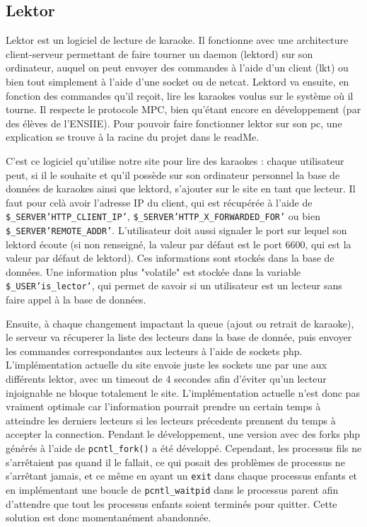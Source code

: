 \subsection{Lektor}

Lektor est un logiciel de lecture de karaoke. Il fonctionne avec une architecture client-serveur permettant de faire tourner un daemon (lektord) sur son ordinateur, auquel on peut envoyer des commandes à l'aide d'un client (lkt) ou bien tout simplement à l'aide d'une socket ou de netcat. Lektord va ensuite, en fonction des commandes qu'il reçoit, lire les karaokes voulus sur le système où il tourne. Il respecte le protocole MPC, bien qu'étant encore en développement (par des élèves de
l'ENSIIE).\newline
Pour pouvoir faire fonctionner lektor sur son pc, une explication se trouve à la racine du projet dans le readMe.\newline

C'est ce logiciel qu'utilise notre site pour lire des karaokes : chaque utilisateur peut, si il le souhaite et qu'il possède sur son ordinateur personnel la base de données de karaokes ainsi que lektord, s'ajouter sur le site en tant que lecteur. Il faut pour celà avoir l'adresse IP du client, qui est récupérée à l'aide de \texttt{\$\_SERVER\lbrack'HTTP\_CLIENT\_IP'\rbrack}, \texttt{\$\_SERVER\lbrack'HTTP\_X\_FORWARDED\_FOR'\rbrack} ou bien \texttt{\$\_SERVER\lbrack'REMOTE\_ADDR'\rbrack}.
L'utilisateur doit aussi signaler le port sur lequel son lektord écoute (si non renseigné, la valeur par défaut est le port 6600, qui est la valeur par défaut de lektord).
Ces informations sont stockés dans la base de données.
Une information plus "volatile" est stockée dans la variable \texttt{\$\_USER\lbrack'is\_lector'\rbrack}, qui permet de savoir si un utilisateur est un lecteur sans faire appel à la base de données.

Ensuite, à chaque changement impactant la queue (ajout ou retrait de karaoke), le serveur va récuperer la liste des lecteurs dans la base de donnée, puis envoyer les commandes correspondantes aux lecteurs à l'aide de sockets php.
L'implémentation actuelle du site envoie juste les sockets une par une aux différents lektor, avec un timeout de 4 secondes afin d'éviter qu'un lecteur injoignable ne bloque totalement le site. L'implémentation actuelle n'est donc pas vraiment optimale car l'information pourrait prendre un certain temps à atteindre les derniers lecteurs si les lecteurs précedents prennent du temps à accepter la connection. Pendant le développement, une version avec des forks php générés à l'aide de
\texttt{pcntl\_fork()} a été développé. Cependant, les processus fils ne s'arrêtaient pas quand il le fallait, ce qui posait des problèmes de processus ne s'arrêtant jamais, et ce même en ayant un \texttt{exit} dans chaque processus enfants et en implémentant une boucle de \texttt{pcntl\_waitpid} dans le processus parent afin d'attendre que tout les processus enfants soient terminés pour quitter.
Cette solution est donc momentanément abandonnée.
